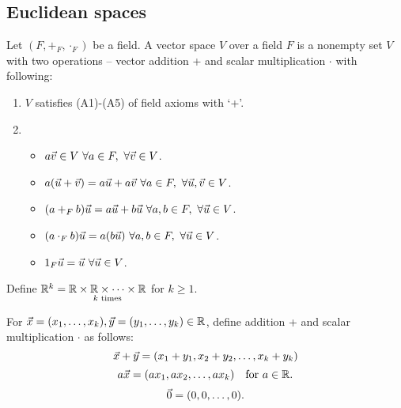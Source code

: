 \documentclass[]{article}
\begin{document}
\subsection{Euclidean spaces}
\begin{definition}
	 Let $(F,+_F,\cdot_F)$ be a field. A vector space $V$ over a field $F$ is a nonempty set $V$ with two operations -- vector addition + and scalar multiplication $\cdot$ with following:
	\begin{enumerate}
		\item $V$ satisfies (A1)-(A5) of field axioms with `+'.
		\item \begin{itemize}
			\item $a\vec{v}\in V\ \forall a\in F,\ \forall \vec{v}\in V$.
			\item $a(\vec{u} + \vec{v}) = a\vec{u} + a\vec{v}\ \forall a\in F,\ \forall \vec{u},\vec{v}\in V$.
			\item $(a+_Fb)\vec{u} = a\vec{u} + b\vec{u}\ \forall a,b\in F,\ \forall \vec{u} \in V$.
			\item $(a\cdot_Fb)\vec{u} = a(b\vec{u})\ \forall a,b\in F,\ \forall \vec{u}\in V$.
			\item $1_F\vec{u} = \vec{u}\ \forall \vec{u}\in V$.
		\end{itemize}
	\end{enumerate}
\end{definition}

Define $\mathbb{R}^k = \underset{k\text{ times}}{\mathbb{R}\times \mathbb{R}\times \dots \times \mathbb{R}}$ for $k\geq 1$.

For $\vec{x} = (x_1,\dots,x_k), \vec{y} = (y_1,\dots,y_k)\in\mathbb{R}$, define addition + and scalar multiplication $\cdot$ as follows:
$$ \vec{x} + \vec{y} = (x_1+y_1,x_2+y_2,\dots,x_k+y_k)$$
$$ a\vec{x} = (ax_1,ax_2,\dots,ax_k) \quad \text{for }a\in\mathbb{R}.$$
$$ \vec{0} = (0,0,\dots,0).$$
\end{document}
